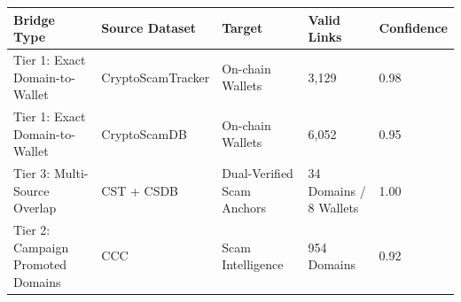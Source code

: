 \begin{tabular}{lllll}
\toprule
Bridge Type & Source Dataset & Target & Valid Links & Confidence \\
\midrule
Tier 1: Exact Domain-to-Wallet & CryptoScamTracker & On-chain Wallets & 3,129 & 0.98 \\
Tier 1: Exact Domain-to-Wallet & CryptoScamDB & On-chain Wallets & 6,052 & 0.95 \\
Tier 3: Multi-Source Overlap & CST + CSDB & Dual-Verified Scam Anchors & 34 Domains / 8 Wallets & 1.00 \\
Tier 2: Campaign Promoted Domains & CCC & Scam Intelligence & 954 Domains & 0.92 \\
\bottomrule
\end{tabular}
